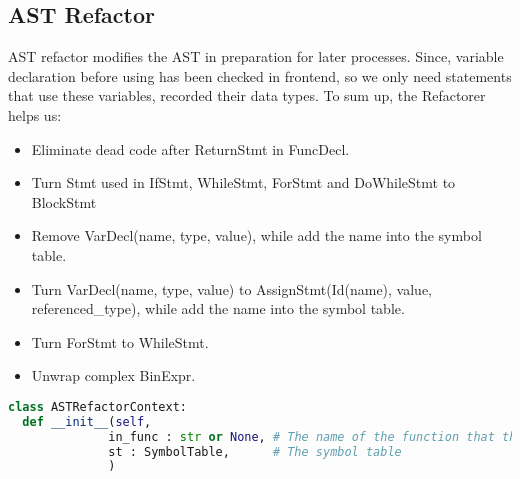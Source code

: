 \subsection{AST Refactor}

AST refactor modifies the AST in preparation for later processes. Since, variable declaration before using has been checked in frontend, so we only need statements that use these variables, recorded their data types. To sum up, the Refactorer helps us:

\begin{itemize}
  \item Eliminate dead code after ReturnStmt in FuncDecl.
  \item Turn Stmt used in IfStmt, WhileStmt, ForStmt and DoWhileStmt to BlockStmt
  \item Remove VarDecl(name, type, value), while add the name into the symbol table.
  \item Turn VarDecl(name, type, value) to AssignStmt(Id(name), value, referenced\_type), while add the name into the symbol table.
  \item Turn ForStmt to WhileStmt.
  \item Unwrap complex BinExpr.
\end{itemize}

\begin{lstlisting}[language=Python]
class ASTRefactorContext:
  def __init__(self,
              in_func : str or None, # The name of the function that the visited statement belongs to
              st : SymbolTable,      # The symbol table
              )
\end{lstlisting}
